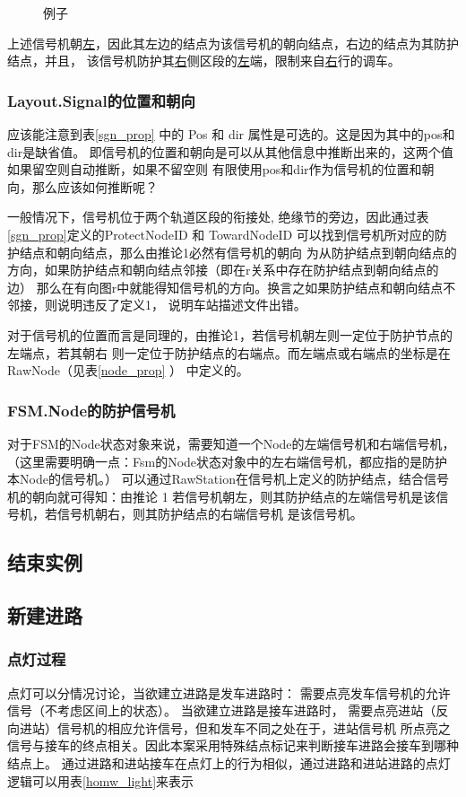 \begin{figure}[ht]
    \centering
    
    \caption{\label{ens1}例子}
\end{figure}

上述信号机朝\uline{左}，因此其左边的结点为该信号机的朝向结点，右边的结点为其防护结点，并且，
该信号机防护其\uline{右}侧区段的\uline{左}端，限制来自\uline{右}行的调车。

\subsubsection{Layout.Signal的位置和朝向}
应该能注意到表\ref{sgn_prop} 中的 Pos 和 dir 属性是可选的。这是因为其中的pos和dir是缺省值。
即信号机的位置和朝向是可以从其他信息中推断出来的，这两个值如果留空则自动推断，如果不留空则
有限使用pos和dir作为信号机的位置和朝向，那么应该如何推断呢？

一般情况下，信号机位于两个轨道区段的衔接处, 绝缘节的旁边，因此通过表\ref{sgn_prop}定义的ProtectNodeID
和 TowardNodeID 可以找到信号机所对应的防护结点和朝向结点，那么由推论1必然有信号机的朝向
为从防护结点到朝向结点的方向，如果防护结点和朝向结点邻接（即在r关系中存在防护结点到朝向结点的边）
那么在有向图r中就能得知信号机的方向。换言之如果防护结点和朝向结点不邻接，则说明违反了定义1，
说明车站描述文件出错。

对于信号机的位置而言是同理的，由推论1，若信号机朝左则一定位于防护节点的左端点，若其朝右
则一定位于防护结点的右端点。而左端点或右端点的坐标是在RawNode（见表\ref{node_prop} ）
中定义的。

\subsubsection{FSM.Node的防护信号机}
对于FSM的Node状态对象来说，需要知道一个Node的左端信号机和右端信号机，
（这里需要明确一点：Fsm的Node状态对象中的左右端信号机，都应指的是防护本Node的信号机。）
可以通过RawStation在信号机上定义的防护结点，结合信号机的朝向就可得知：由推论 1
若信号机朝左，则其防护结点的左端信号机是该信号机，若信号机朝右，则其防护结点的右端信号机
是该信号机。

\subsection{结束实例}
\subsection{新建进路}

\subsubsection{点灯过程}
点灯可以分情况讨论，当欲建立进路是发车进路时：
需要点亮发车信号机的允许信号（不考虑区间上的状态）。
当欲建立进路是接车进路时，
需要点亮进站（反向进站）信号机的相应允许信号，但和发车不同之处在于，进站信号机
所点亮之信号与接车的终点相关。因此本案采用特殊结点标记来判断接车进路会接车到哪种结点上。
通过进路和进站接车在点灯上的行为相似，通过进路和进站进路的点灯逻辑可以用表\ref{homw_light}来表示

